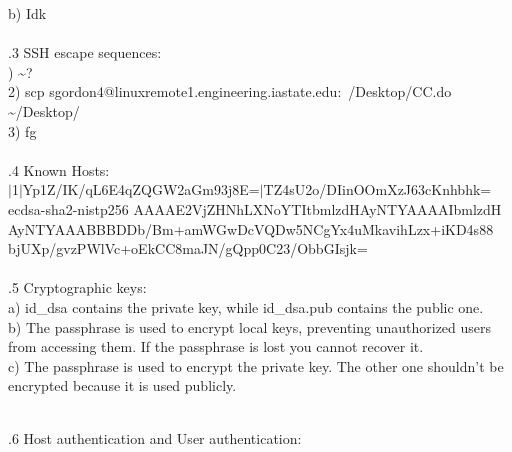 \documentclass[12pt]{article}
\begin{document}
b) Idk \\

\hrulefill\\

.3 SSH escape sequences: \\

) \textasciitilde ?\\
2) scp sgordon4@linuxremote1.engineering.iastate.edu:~/Desktop/CC.do \textasciitilde /Desktop/\\
3) fg\\

\hrulefill\\

.4 Known Hosts:\\

\noindent $|$1$|$Yp1Z/IK/qL6E4qZQGW2aGm93j8E=$|$TZ4sU2o/DIinOOmXzJ63cKnhbhk= ecdsa-sha2-nistp256 AAAAE2VjZHNhLXNoYTItbmlzdHAyNTYAAAAIbmlzdH\\
AyNTYAAABBBDDb/Bm+amWGwDcVQDw5NCgYx4uMkavihLzx+iKD4s88\\
bjUXp/gvzPWlVc+oEkCC8maJN/gQpp0C23/ObbGIsjk=\\

\hrulefill\\

.5 Cryptographic keys:\\

a) id\_dsa contains the private key, while id\_dsa.pub contains the public one.\\

b) The passphrase is used to encrypt local keys, preventing unauthorized users from accessing them. If the passphrase is lost you cannot recover it.\\

c) The passphrase is used to encrypt the private key. The other one shouldn't be encrypted because it is used publicly.\\

\hrulefill\\
\pagebreak

.6 Host authentication and User authentication:\\
\end{document}
